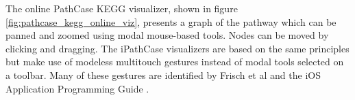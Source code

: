 The online PathCase KEGG visualizer, shown in figure
\ref{fig:pathcase_kegg_online_viz}, presents a graph of the pathway which can be
panned and zoomed using modal mouse-based tools. Nodes can be moved by clicking
and dragging. The iPathCase visualizers are based on the same principles but
make use of modeless multitouch gestures instead of modal tools selected on a
toolbar. Many of these gestures are identified by Frisch et al
\cite{multitouch:gestures} and the iOS Application Programming Guide
\cite{ios:application-programming-guide}.
